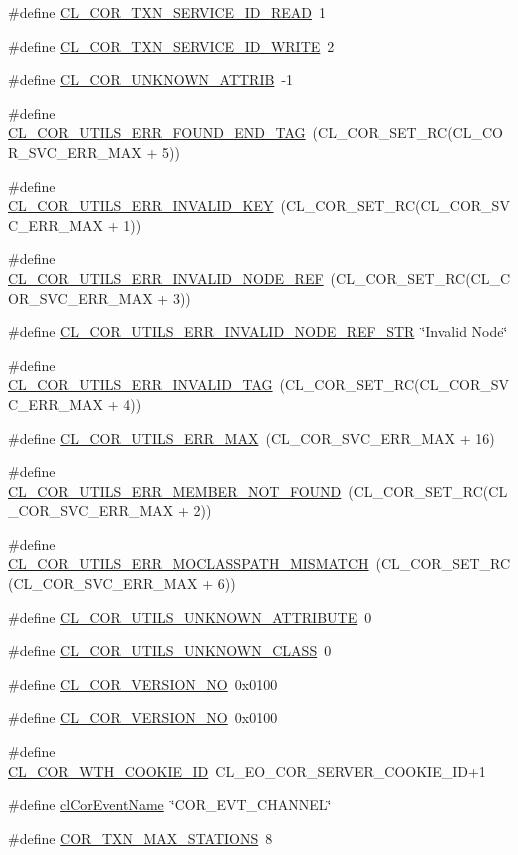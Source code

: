 \begin{CompactItemize}
\item 
\#define \hyperlink{group__group13_ga321}{CL\_\-COR\_\-TXN\_\-SERVICE\_\-ID\_\-READ}~1
\item 
\#define \hyperlink{group__group13_ga322}{CL\_\-COR\_\-TXN\_\-SERVICE\_\-ID\_\-WRITE}~2
\item 
\#define \hyperlink{group__group13_ga285}{CL\_\-COR\_\-UNKNOWN\_\-ATTRIB}~-1
\item 
\#define \hyperlink{group__group13_ga238}{CL\_\-COR\_\-UTILS\_\-ERR\_\-FOUND\_\-END\_\-TAG}~(CL\_\-COR\_\-SET\_\-RC(CL\_\-COR\_\-SVC\_\-ERR\_\-MAX + 5))
\item 
\#define \hyperlink{group__group13_ga234}{CL\_\-COR\_\-UTILS\_\-ERR\_\-INVALID\_\-KEY}~(CL\_\-COR\_\-SET\_\-RC(CL\_\-COR\_\-SVC\_\-ERR\_\-MAX + 1))
\item 
\#define \hyperlink{group__group13_ga236}{CL\_\-COR\_\-UTILS\_\-ERR\_\-INVALID\_\-NODE\_\-REF}~(CL\_\-COR\_\-SET\_\-RC(CL\_\-COR\_\-SVC\_\-ERR\_\-MAX + 3))
\item 
\#define \hyperlink{group__group13_ga268}{CL\_\-COR\_\-UTILS\_\-ERR\_\-INVALID\_\-NODE\_\-REF\_\-STR}~\char`\"{}Invalid Node\char`\"{}
\item 
\#define \hyperlink{group__group13_ga237}{CL\_\-COR\_\-UTILS\_\-ERR\_\-INVALID\_\-TAG}~(CL\_\-COR\_\-SET\_\-RC(CL\_\-COR\_\-SVC\_\-ERR\_\-MAX + 4))
\item 
\#define \hyperlink{group__group13_ga240}{CL\_\-COR\_\-UTILS\_\-ERR\_\-MAX}~(CL\_\-COR\_\-SVC\_\-ERR\_\-MAX + 16)
\item 
\#define \hyperlink{group__group13_ga235}{CL\_\-COR\_\-UTILS\_\-ERR\_\-MEMBER\_\-NOT\_\-FOUND}~(CL\_\-COR\_\-SET\_\-RC(CL\_\-COR\_\-SVC\_\-ERR\_\-MAX + 2))
\item 
\#define \hyperlink{group__group13_ga239}{CL\_\-COR\_\-UTILS\_\-ERR\_\-MOCLASSPATH\_\-MISMATCH}~(CL\_\-COR\_\-SET\_\-RC(CL\_\-COR\_\-SVC\_\-ERR\_\-MAX + 6))
\item 
\#define \hyperlink{group__group13_ga323}{CL\_\-COR\_\-UTILS\_\-UNKNOWN\_\-ATTRIBUTE}~0
\item 
\#define \hyperlink{group__group13_ga324}{CL\_\-COR\_\-UTILS\_\-UNKNOWN\_\-CLASS}~0
\item 
\#define \hyperlink{group__group13_ga276}{CL\_\-COR\_\-VERSION\_\-NO}~0x0100
\item 
\#define \hyperlink{group__group13_ga275}{CL\_\-COR\_\-VERSION\_\-NO}~0x0100
\item 
\#define \hyperlink{group__group13_ga274}{CL\_\-COR\_\-WTH\_\-COOKIE\_\-ID}~CL\_\-EO\_\-COR\_\-SERVER\_\-COOKIE\_\-ID+1
\item 
\#define \hyperlink{group__group13_ga318}{cl\-Cor\-Event\-Name}~\char`\"{}COR\_\-EVT\_\-CHANNEL\char`\"{}
\item 
\#define \hyperlink{group__group13_ga320}{COR\_\-TXN\_\-MAX\_\-STATIONS}~8
\end{CompactItemize}
